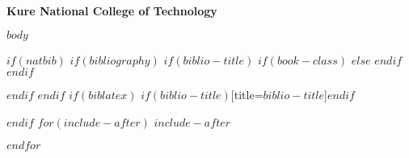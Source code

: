 \documentclass[12pt,a4paper,$if(lang)$$babel-lang$,$endif$]{ltjsarticle}
\begin{document}
\vspace{10mm}

\begin{center}
  \textbf{Kure National College of Technology}
\end{center}

\thispagestyle{empty}
\newpage
\setcounter{page}{1}

\normalsize

$body$

$if(natbib)$
$if(bibliography)$
$if(biblio-title)$
$if(book-class)$
\renewcommand\bibname{$biblio-title$}
$else$
\renewcommand\refname{$biblio-title$}
$endif$
$endif$


$endif$
$endif$
$if(biblatex)$
\printbibliography$if(biblio-title)$[title=$biblio-title$]$endif$

$endif$
$for(include-after)$
$include-after$

$endfor$
\end{document}

